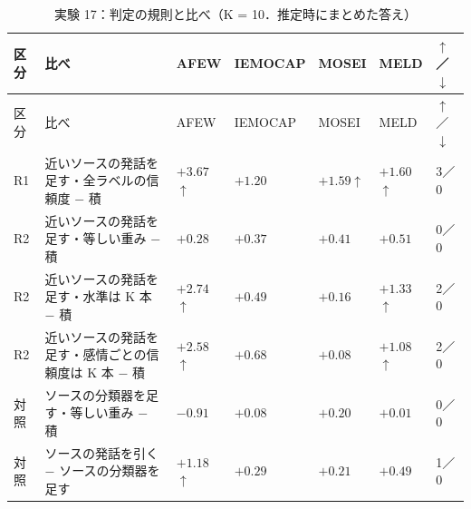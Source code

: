 \begin{longtable}{>{\raggedright}p{0.75cm}>{\raggedright}p{5.6cm}>{\raggedright}p{2.05cm}>{\raggedright}p{2.05cm}>{\raggedright}p{2.05cm}>{\raggedright}p{2.05cm}p{0.75cm}}
\caption{実験 17：判定の規則と比べ（K = 10．推定時にまとめた答え）}\\
\toprule
区分 & 比べ & AFEW & IEMOCAP & MOSEI & MELD & $\uparrow$／$\downarrow$ \\
\midrule
\endfirsthead
\toprule
区分 & 比べ & AFEW & IEMOCAP & MOSEI & MELD & $\uparrow$／$\downarrow$ \\
\midrule
\endhead
\bottomrule
\endfoot

R1 & 近いソースの発話を足す・全ラベルの信頼度 $-$ 積 & $+3.67$$\uparrow$\newline{\tiny [$+$1.6, $+$5.7]} & $+1.20$\newline{\tiny [$-$0.3, $+$2.7]} & $+1.59$$\uparrow$\newline{\tiny [$+$1.0, $+$2.2]} & $+1.60$$\uparrow$\newline{\tiny [$+$0.7, $+$2.5]} & 3／0 \\
R2 & 近いソースの発話を足す・等しい重み $-$ 積 & $+0.28$\newline{\tiny [$-$0.3, $+$0.9]} & $+0.37$\newline{\tiny [$-$0.9, $+$1.7]} & $+0.41$\newline{\tiny [$-$0.2, $+$1.0]} & $+0.51$\newline{\tiny [$-$0.5, $+$1.6]} & 0／0 \\
R2 & 近いソースの発話を足す・水準は K 本 $-$ 積 & $+2.74$$\uparrow$\newline{\tiny [$+$1.5, $+$4.0]} & $+0.49$\newline{\tiny [$-$0.4, $+$1.4]} & $+0.16$\newline{\tiny [$-$0.4, $+$0.7]} & $+1.33$$\uparrow$\newline{\tiny [$+$0.6, $+$2.1]} & 2／0 \\
R2 & 近いソースの発話を足す・感情ごとの信頼度は K 本 $-$ 積 & $+2.58$$\uparrow$\newline{\tiny [$+$1.1, $+$4.1]} & $+0.68$\newline{\tiny [$-$0.9, $+$2.3]} & $+0.08$\newline{\tiny [$-$0.8, $+$0.9]} & $+1.08$$\uparrow$\newline{\tiny [$+$0.2, $+$1.9]} & 2／0 \\
対照 & ソースの分類器を足す・等しい重み $-$ 積 & $-0.91$ & $+0.08$ & $+0.20$ & $+0.01$ & 0／0 \\
対照 & ソースの発話を引く $-$ ソースの分類器を足す & $+1.18$$\uparrow$ & $+0.29$ & $+0.21$ & $+0.49$ & 1／0 \\

\end{longtable}
